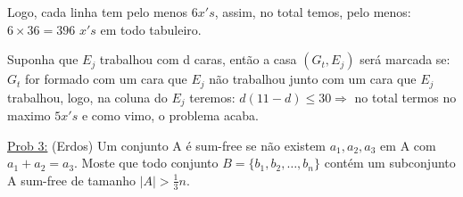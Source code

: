 \documentclass[a4paper,12pt]{article}
\renewcommand{\leq}{\ensuremath{\leqslant}}
\theoremstyle{plain} %
\theoremstyle{definition} %
\theoremstyle{remark} %
\begin{document}
\begin{framed}
		Logo, cada linha tem pelo menos $6 x's$, assim, no total temos, pelo menos: $6\times 36=396$ $x's$ em todo tabuleiro.
		
		Suponha que $E_j$ trabalhou com d caras, ent\~ao a casa $(G_t, E_j)$ ser\'a marcada se: $G_t$ for formado com um cara que $E_j$ n\~ao trabalhou junto com um cara que $E_j$ trabalhou, logo, na coluna do $E_j$ teremos: $d(11-d)\leq 30\Rightarrow$ no total termos no maximo $5 x's$ e como vimo, o problema acaba.  \tiny\textblock 
	\end{framed}
	
	\normalsize
	
	\vspace{2ex}\underline{Prob 3:} (Erdos) Um conjunto A \'e sum-free se n\~ao existem $a_1, a_2, a_3$ em A com $a_1+a_2=a_3$. Moste que todo conjunto $B=\{b_1, b_2, \dotso, b_n\}$ cont\'em um subconjunto A sum-free de tamanho $|A|>\frac{1}{3}n$.
	
\end{document}
